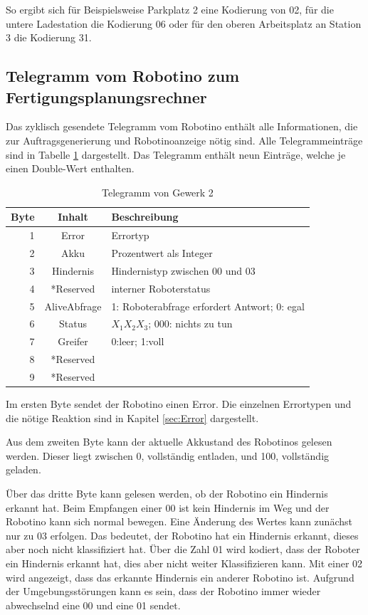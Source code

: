 So ergibt sich für Beispielsweise Parkplatz 2 eine Kodierung von 02, für die untere Ladestation die Kodierung 06 oder für den oberen Arbeitsplatz an Station 3 die Kodierung 31.

\subsection{Telegramm vom Robotino zum Fertigungsplanungsrechner}

Das zyklisch gesendete Telegramm vom Robotino enthält alle Informationen, die zur Auftragsgenerierung und Robotinoanzeige nötig sind. Alle Telegrammeinträge sind in Tabelle \ref{tab:TelegrammVonG2} dargestellt. Das Telegramm enthält neun Einträge, welche je einen Double-Wert enthalten. 

\begin{table}[!ht]
	\centering
	\begin{tabular}{|r|c|l|}
		\hline
		Byte & Inhalt	&	Beschreibung \\
		\hline
			1  & Error &  Errortyp  \\
			2  & Akku  & Prozentwert als Integer \\
			3  & Hindernis & Hindernistyp zwischen 00 und 03\\
		  4  & *Reserved &  interner Roboterstatus \\
		  5  & AliveAbfrage  & 1: Roboterabfrage erfordert Antwort; 0: egal \\
		  6  & Status & $X_1X_2X_3$; 000: nichts zu tun \\
		  7  & Greifer   & 0:leer; 1:voll \\
		  8  & *Reserved &  \\
		  9  & *Reserved   &  \\
		\hline
	\end{tabular}
	\caption{Telegramm von Gewerk 2}
	\label{tab:TelegrammVonG2}
\end{table}

Im ersten Byte sendet der Robotino einen Error. Die einzelnen Errortypen und die nötige Reaktion sind in Kapitel \ref{sec:Error} dargestellt. 

Aus dem zweiten Byte kann der aktuelle Akkustand des Robotinos gelesen werden. Dieser liegt zwischen 0, vollständig entladen, und 100, vollständig geladen. 

Über das dritte Byte kann gelesen werden, ob der Robotino ein Hindernis erkannt hat. Beim Empfangen einer 00 ist kein Hindernis im Weg und der Robotino kann sich normal bewegen. Eine Änderung des Wertes kann zunächst nur zu 03 erfolgen. Das bedeutet, der Robotino hat ein Hindernis erkannt, dieses aber noch nicht klassifiziert hat. Über die Zahl 01 wird kodiert, dass der Roboter ein Hindernis erkannt hat, dies aber nicht weiter Klassifizieren kann. Mit einer 02 wird angezeigt, dass das erkannte Hindernis ein anderer Robotino ist. Aufgrund der Umgebungsstörungen kann es sein, dass der Robotino immer wieder abwechselnd eine 00 und eine 01 sendet. 

